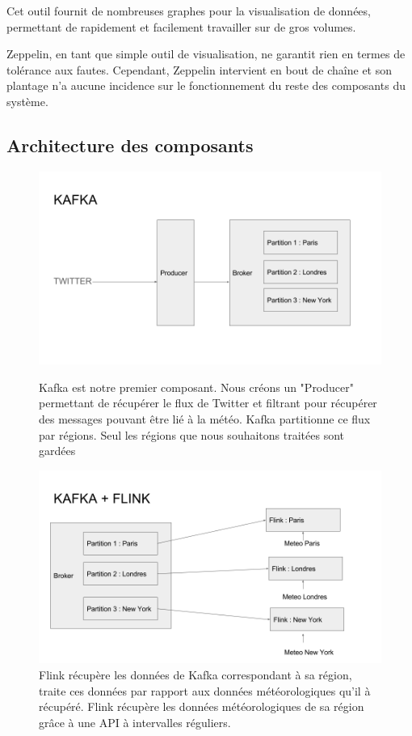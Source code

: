 \documentclass[a4paper,oneside,10pt]{article}
\begin{document}
Cet outil fournit de nombreuses graphes pour la visualisation de données, permettant de rapidement et facilement travailler sur de gros volumes.

Zeppelin, en tant que simple outil de visualisation, ne garantit rien en termes de tolérance aux fautes. Cependant, Zeppelin intervient en bout de chaîne et son plantage n'a aucune incidence sur le fonctionnement du reste des composants du système. 

\subsection{Architecture des composants}

\begin{figure}[h]
\centering
\includegraphics[width=15cm]{content/Kafka.png}
\caption{Kafka est notre premier composant. Nous créons un "Producer" permettant de récupérer le flux de Twitter et filtrant pour récupérer des messages pouvant être lié à la météo. Kafka partitionne ce flux par régions. Seul les régions que nous souhaitons traitées sont gardées}
\label{fig1}
\centering
\includegraphics[width=15cm]{content/KafkaFlink.png}
\caption{Flink récupère les données de Kafka correspondant à sa région, traite ces données par rapport aux données météorologiques qu'il à récupéré. Flink récupère les données météorologiques de sa région grâce à une API à intervalles réguliers. }
\label{fig1}
\end{figure}
\end{document}
